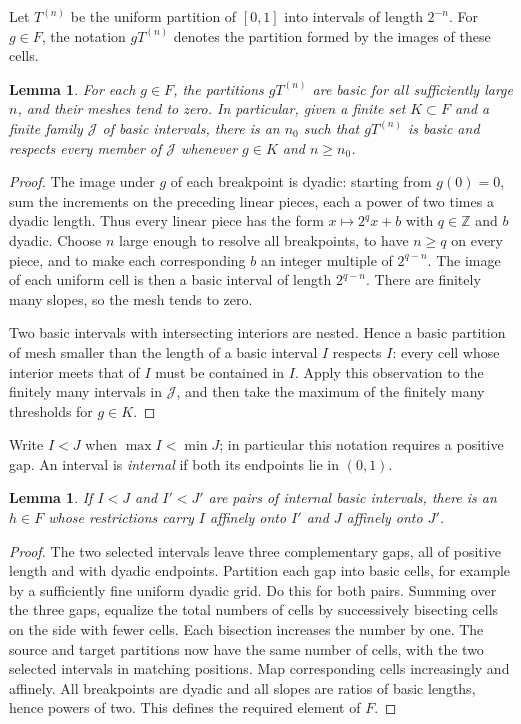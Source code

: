 \documentclass[11pt]{article}
\newtheorem{lemma}[theorem]{Lemma}
\theoremstyle{definition}
\numberwithin{equation}{section}
\begin{document}
Let $T^{(n)}$ be the uniform partition of $[0,1]$ into intervals of
length $2^{-n}$.  For $g\in F$, the notation $gT^{(n)}$ denotes the
partition formed by the images of these cells.

\begin{lemma}\label{dyad:eventual}
For each $g\in F$, the partitions $gT^{(n)}$ are basic for all
sufficiently large $n$, and their meshes tend to zero.  In particular,
given a finite set $K\subset F$ and a finite family $\mathcal J$ of
basic intervals, there is an $n_0$ such that $gT^{(n)}$ is basic and
respects every member of $\mathcal J$ whenever $g\in K$ and $n\geq n_0$.
\end{lemma}

\begin{proof}
The image under $g$ of each breakpoint is dyadic: starting from
$g(0)=0$, sum the increments on the preceding linear pieces, each a
power of two times a dyadic length.  Thus every linear piece has the
form $x\mapsto 2^q x+b$ with $q\in\mathbb Z$ and $b$ dyadic.  Choose
$n$ large enough to resolve all breakpoints, to have $n\geq q$ on
every piece, and to make each corresponding $b$ an integer multiple
of $2^{q-n}$.  The image of each uniform cell is then a basic interval
of length $2^{q-n}$.  There are finitely many slopes, so the mesh tends
to zero.

Two basic intervals with intersecting interiors are nested.  Hence
a basic partition of mesh smaller than the length of a basic
interval $I$ respects $I$: every cell whose interior meets that of
$I$ must be contained in $I$.  Apply this observation to the
finitely many intervals in $\mathcal J$, and then take the maximum
of the finitely many thresholds for $g\in K$.
\end{proof}

Write $I<J$ when $\max I<\min J$; in particular this notation requires
a positive gap.  An interval is \emph{internal} if both its endpoints
lie in $(0,1)$.

\begin{lemma}\label{dyad:transport}
If $I<J$ and $I'<J'$ are pairs of internal basic intervals, there is
an $h\in F$ whose restrictions carry $I$ affinely onto $I'$ and $J$
affinely onto $J'$.
\end{lemma}

\begin{proof}
The two selected intervals leave three complementary gaps, all of
positive length and with dyadic endpoints.  Partition each gap into
basic cells, for example by a sufficiently fine uniform dyadic
grid.  Do this for both pairs.  Summing over the three
gaps, equalize the total numbers of cells by successively bisecting cells
on the side with fewer cells.  Each bisection increases the number
by one.  The source and target partitions now have the same number
of cells, with the two selected intervals in matching positions.
Map corresponding cells increasingly and affinely.  All
breakpoints are dyadic and all slopes are ratios of basic lengths,
hence powers of two.  This defines the required element of $F$.
\end{proof}
\end{document}
